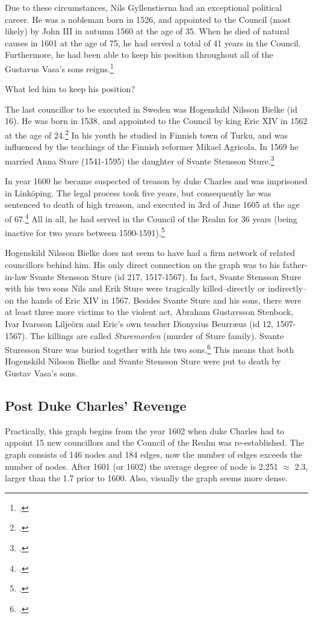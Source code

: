 Due to these circumstances, Nils Gyllenstierna had an exceptional political career. He was a nobleman born in 1526, and appointed to the Council (most likely) by John III in autumn 1560 at the age of 35. When he died of natural causes in 1601 at the age of 75, he had served a total of 41 years in the Council. Furthermore, he had been able to keep his position throughout all of the Gustavus Vasa's sons reigns.\footcite{councillorsDS} 

What led him to keep his position?

The last councillor to be executed in Sweden was Hogenskild Nilsson Bielke (id 16). He was born in 1538, and appointed to the Council by king Eric XIV in 1562 at the age of 24.\footcites[p. 58.]{HakanenAKoskinen2017}{councillorsDS} In his youth he studied in Finnish town of Turku, and was influenced by the teachings of the Finnish reformer Mikael Agricola. In 1569 he married Anna Sture (1541-1595) the daughter of Svante Stensson Sture.\footcite{sbl_bielke_hongeskild}

In year 1600 he became suspected of treason by duke Charles and was imprisoned in Linköping. The legal process took five years, but consequently he was sentenced to death of high treason, and executed in 3rd of June 1605 at the age of 67.\footcite{sbl_bielke_hongeskild} All in all, he had served in the Council of the Realm for 36 years (being inactive for two years between 1590-1591).\footcite{councillorsDS}

Hogenskild Nilsson Bielke does not seem to have had a firm network of related councillors behind him. His only direct connection on the graph was to his father-in-law Svante Stensson Sture (id 217, 1517-1567). In fact, Svante Stensson Sture with his two sons Nils and Erik Sture were tragically killed–directly or indirectly–on the hands of Eric XIV in 1567. Besides Svante Sture and his sons, there were at least three more victims to the violent act, Abraham Gustavsson Stenbock, Ivar Ivarsson Liljeörn and Eric's own teacher Dionysius Beurræus (id 12, 1507-1567). The killings are called \textit{Sturemorden} (murder of Sture family). Svante Sturesson Sture was buried together with his two sons.\footcite{sbl_svante_sture} This means that both Hogenskild Nilsson Bielke and Svante Stensson Sture were put to death by Gustav Vasa's sons.

\subsection{Post Duke Charles' Revenge}
Practically, this graph begins from the year 1602 when duke Charles had to appoint 15 new councillors and the Council of the Realm was re-established. The graph consists of 146 nodes and 184 edges, now the number of edges exceeds the number of nodes. After 1601 (or 1602) the average degree of node is 2.251 $\approx$ 2.3, larger than the 1.7 prior to 1600. Also, visually the graph seems more dense. 

